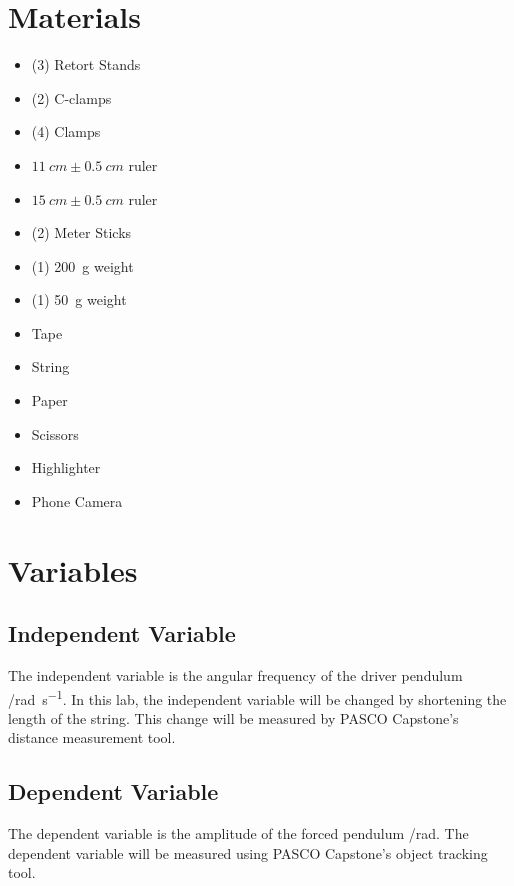 \documentclass[letterpaper, 12pt]{article}
\begin{document}
\section{Materials}

\begin{paracol}{2}
    \begin{itemize}
        \item (3) Retort Stands
        \item (2) C-clamps
        \item (4) Clamps
        \item \(\SI{11}{cm} \pm \SI{0.5}{cm}\) ruler
        \item \(\SI{15}{cm} \pm \SI{0.5}{cm}\) ruler
        \item (2) Meter Sticks
        \item (1) \SI{200}{g} weight
    \end{itemize}
    \switchcolumn
    \begin{itemize}
        \item (1) \SI{50}{g} weight
        \item Tape
        \item String
        \item Paper
        \item Scissors
        \item Highlighter
        \item Phone Camera
    \end{itemize}
\end{paracol}

\section{Variables}

\subsection{Independent Variable}
The independent variable is the angular frequency of the driver pendulum
/\unit{rad.s^{-1}}. In this lab, the independent variable will be changed
by shortening the length of the string. This change will be measured by
PASCO Capstone's distance measurement tool.

\subsection{Dependent Variable}
The dependent variable is the amplitude of the forced pendulum /\unit{rad}.
The dependent variable will be measured using PASCO Capstone's
object tracking tool.
\end{document}
